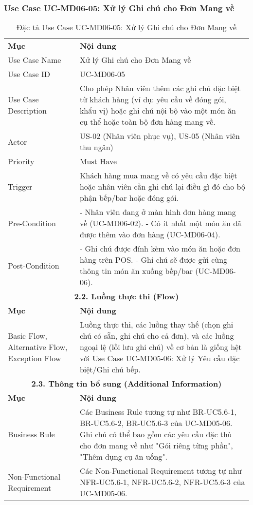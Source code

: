 \subsubsection{Use Case UC-MD06-05: Xử lý Ghi chú cho Đơn Mang về}

\begin{longtable}{|m{4cm}|p{11cm}|}
\caption{Đặc tả Use Case UC-MD06-05: Xử lý Ghi chú cho Đơn Mang về} \label{tab:uc_md06_05} \\
\hline

\endhead %
\hline
\endfoot %
\hline
\endlastfoot %
\multicolumn{2}{|c|}{\textbf{2.1. Tóm tắt (Summary)}} \\
\hline
\textbf{Mục} & \textbf{Nội dung} \\
\hline
Use Case Name & Xử lý Ghi chú cho Đơn Mang về \\
\hline
Use Case ID & UC-MD06-05 \\
\hline
Use Case Description & Cho phép Nhân viên thêm các ghi chú đặc biệt từ khách hàng (ví dụ: yêu cầu về đóng gói, khẩu vị) hoặc ghi chú nội bộ vào một món ăn cụ thể hoặc toàn bộ đơn hàng mang về. \\
\hline
Actor & US-02 (Nhân viên phục vụ), US-05 (Nhân viên thu ngân) \\
\hline
Priority & Must Have \\
\hline
Trigger & Khách hàng mua mang về có yêu cầu đặc biệt hoặc nhân viên cần ghi chú lại điều gì đó cho bộ phận bếp/bar hoặc đóng gói. \\
\hline
Pre-Condition & - Nhân viên đang ở màn hình đơn hàng mang về (UC-MD06-02). \newline - Có ít nhất một món ăn đã được thêm vào đơn hàng (UC-MD06-04). \\
\hline
Post-Condition & - Ghi chú được đính kèm vào món ăn hoặc đơn hàng trên POS. \newline - Ghi chú sẽ được gửi cùng thông tin món ăn xuống bếp/bar (UC-MD06-06). \\
\hline
\multicolumn{2}{|c|}{\textbf{2.2. Luồng thực thi (Flow)}} \\
\hline
\textbf{Mục} & \textbf{Nội dung} \\
\hline
Basic Flow, Alternative Flow, Exception Flow & Luồng thực thi, các luồng thay thế (chọn ghi chú có sẵn, ghi chú cho cả đơn), và các luồng ngoại lệ (lỗi lưu ghi chú) về cơ bản là giống hệt với Use Case UC-MD05-06: Xử lý Yêu cầu đặc biệt/Ghi chú bếp. \\
\hline
\multicolumn{2}{|c|}{\textbf{2.3. Thông tin bổ sung (Additional Information)}} \\
\hline
\textbf{Mục} & \textbf{Nội dung} \\
\hline
Business Rule & Các Business Rule tương tự như BR-UC5.6-1, BR-UC5.6-2, BR-UC5.6-3 của UC-MD05-06. Ghi chú có thể bao gồm các yêu cầu đặc thù cho đơn mang về như "Gói riêng từng phần", "Thêm dụng cụ ăn uống". \\
\hline
Non-Functional Requirement & Các Non-Functional Requirement tương tự như NFR-UC5.6-1, NFR-UC5.6-2, NFR-UC5.6-3 của UC-MD05-06. \\
\hline
\end{longtable}

